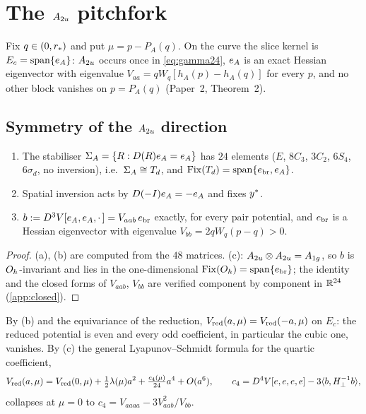 \section{The $A_{2u}$ pitchfork}\label{sec:a2u}

Fix $q\in(0,r_{*})$ and put $\mu=p-P_A(q)$. On the curve the slice kernel is $E_c=\operatorname{span}\{e_{A}\}$: $A_{2u}$ occurs once
in \eqref{eq:gamma24}, $e_{A}$ is an exact Hessian eigenvector with eigenvalue $V_{aa}=qW_q[h_A(p)-h_A(q)]$ for every
$p$, and no other block vanishes on $p=P_A(q)$ (Paper~2, Theorem~2).

\subsection{Symmetry of the $A_{2u}$ direction}\label{sec:a2u-sym}

\begin{lemma}\label{lem:a0}
\begin{enumerate}[label=(\alph*)]
\item The stabiliser $\Sigma_A=\{R:D(R)e_{A}=e_{A}\}$ has $24$ elements ($E$, $8C_3$, $3C_2$, $6S_4$, $6\sigma_d$, no
inversion), i.e.\ $\Sigma_A\cong T_{d}$, and $\operatorname{Fix}(T_{d})=\operatorname{span}\{e_{\mathrm{br}},e_{A}\}$.
\item Spatial inversion acts by $D(-I)e_{A}=-e_{A}$ and fixes $y^{*}$.
\item $b:=D^3V[e_{A},e_{A},\cdot\,]=V_{aab}\,e_{\mathrm{br}}$ exactly, for every pair potential, and $e_{\mathrm{br}}$ is a Hessian eigenvector with
eigenvalue $V_{bb}=2qW_q(p-q)>0$.
\end{enumerate}
\end{lemma}
\begin{proof}
(a), (b) are computed from the $48$ matrices. (c): $A_{2u}\otimes A_{2u}=A_{1g}$, so $b$ is $O_{h}$-invariant and lies in
the one-dimensional $\operatorname{Fix}(O_{h})=\operatorname{span}\{e_{\mathrm{br}}\}$; the identity and the closed forms of $V_{aab}$, $V_{bb}$ are verified
component by component in $\mathbb{R}^{24}$ (\cref{app:closed}).
\end{proof}

By (b) and the equivariance of the reduction, $V_{\mathrm{red}}(a,\mu)=V_{\mathrm{red}}(-a,\mu)$ on $E_c$: the reduced potential is even
and every odd coefficient, in particular the cubic one, vanishes. By (c) the general Lyapunov--Schmidt formula for the
quartic coefficient,
\begin{equation}\label{eq:c4general}
V_{\mathrm{red}}(a,\mu)=V_{\mathrm{red}}(0,\mu)+\tfrac12\lambda(\mu)a^2+\tfrac{c_4(\mu)}{24}a^4+O(a^6),\qquad
c_4=D^4V[e,e,e,e]-3\langle b,H_\perp^{-1}b\rangle,
\end{equation}
collapses at $\mu=0$ to $c_4=V_{aaaa}-3V_{aab}^2/V_{bb}$.

